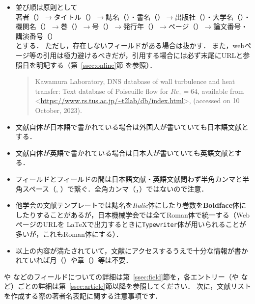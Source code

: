 \begin{tcolorbox}[enhanced, title=\textgt{文献リスト作成の注意事項（全体）}, drop fuzzy shadow]
    \begin{itemize}
        \item 並び順は原則として \\
            著者（\ttauthor）$\to$タイトル（\tttitle）$\to$誌名（\ttjournal）・書名（\ttbooktitle）$\to$出版社（\ttpublisher）・大学名（\ttschool）・機関名（\ttinstitution）$\to$巻（\ttvolume）$\to$号（\ttnumber）$\to$発行年（\ttyear）$\to$ページ（\ttpages）$\to$論文番号・講演番号（\ttnote） \\
            とする．
            ただし，存在しないフィールドがある場合は抜かす．
            また，webページ等の引用は極力避けるべきだが，引用する場合には必ず末尾にURLと参照日を明記する（第~\ref{ssec:online}節 \ttonline を参照）．
            \begin{quote}
                Kawamura Laboratory, DNS database of wall turbulence and heat transfer: Text database of Poiseuille flow for $\mathit{Re}_\tau = 64$, available from \textless\url{https://www.rs.tus.ac.jp/~t2lab/db/index.html}\textgreater, (accessed on 10 October, 2023).
            \end{quote}
        \item 文献自体が日本語で書かれている場合は外国人が書いていても日本語文献とする．
        \item 文献自体が英語で書かれている場合は日本人が書いていても英語文献とする．
        \item フィールドとフィールドの間は日本語文献・英語文献問わず半角カンマと半角スペース（, ）で繋ぐ．全角カンマ（，）ではないので注意．
        \item 他学会の文献テンプレートでは誌名を\textit{Italic}体にしたり巻数を\textbf{Boldface}体にしたりすることがあるが，日本機械学会では全て\textrm{Roman}体で統一する（WebページのURLを \LaTeX で出力するときに\texttt{Typewriter}体が用いられることが多いが，これも\textrm{Roman}体にする）．
        \item 以上の内容が満たされていて，文献にアクセスするうえで十分な情報が書かれていれば月（\ttmonth）や章（\ttchapter）等は不要．
    \end{itemize}
\end{tcolorbox}
\renewcommand\UrlFont{\ttfamily}
\noindent
\ttauthor や \tttitle などのフィールドについての詳細は第~\ref{ssec:field}節を，各エントリー（\ttarticle や \ttbook など）ごとの詳細は第~\ref{ssec:article}節以降を参照してください．
次に，文献リストを作成する際の著者名表記に関する注意事項です．
